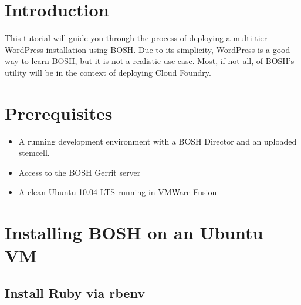 
\def\mytitle{BOSH Tutorial}
\def\myauthor{VMware 2012 - Cloud Foundry - Internal Use Only}
\def\latexmode{memoir}

\chapter{Introduction}
\label{introduction}

This tutorial will guide you through the process of deploying a multi-tier WordPress installation using BOSH. Due to its simplicity, WordPress is a good way to learn BOSH, but it is not a realistic use case. Most, if not all, of BOSH’s utility will be in the context of deploying Cloud Foundry.

\chapter{Prerequisites}
\label{prerequisites}

\begin{itemize}
\item A running development environment with a BOSH Director and an uploaded stemcell.

\item Access to the BOSH Gerrit server

\item A clean Ubuntu 10.04 LTS running in VMWare Fusion

\end{itemize}

\chapter{Installing BOSH on an Ubuntu VM}
\label{installingboshonanubuntuvm}

\section{Install Ruby via rbenv}
\label{installrubyviarbenv}

